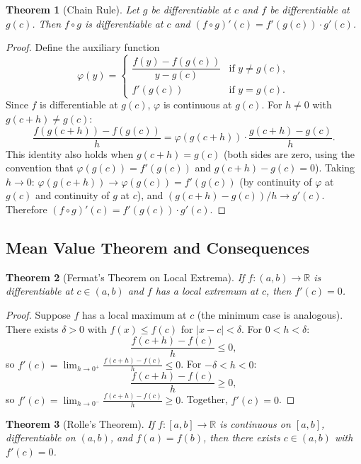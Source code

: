 \documentclass[11pt,a4paper]{article}
\theoremstyle{definition}
\theoremstyle{plain}
\newtheorem{theorem}{Theorem}[section]
\theoremstyle{remark}
\newcommand{\R}{\mathbb{R}}
\begin{document}
\begin{theorem}[Chain Rule]
\label{thm:chain_rule}
Let $g$ be differentiable at $c$ and $f$ be differentiable at $g(c)$. Then
$f \circ g$ is differentiable at $c$ and $(f \circ g)'(c) = f'(g(c)) \cdot g'(c)$.
\end{theorem}

\begin{proof}
Define the auxiliary function
\[
\varphi(y) =
\begin{cases}
\dfrac{f(y) - f(g(c))}{y - g(c)} & \text{if } y \neq g(c), \\[6pt]
f'(g(c)) & \text{if } y = g(c).
\end{cases}
\]
Since $f$ is differentiable at $g(c)$, $\varphi$ is continuous at $g(c)$.
For $h \neq 0$ with $g(c+h) \neq g(c)$:
\[
\frac{f(g(c+h)) - f(g(c))}{h}
= \varphi(g(c+h)) \cdot \frac{g(c+h) - g(c)}{h}.
\]
This identity also holds when $g(c+h) = g(c)$ (both sides are zero, using the
convention that $\varphi(g(c)) = f'(g(c))$ and $g(c+h) - g(c) = 0$).
Taking $h \to 0$: $\varphi(g(c+h)) \to \varphi(g(c)) = f'(g(c))$ (by continuity
of $\varphi$ at $g(c)$ and continuity of $g$ at $c$), and
$(g(c+h) - g(c))/h \to g'(c)$. Therefore
$(f \circ g)'(c) = f'(g(c)) \cdot g'(c)$.
\end{proof}

\subsection{Mean Value Theorem and Consequences}
\label{subsec:mvt}

\begin{theorem}[Fermat's Theorem on Local Extrema]
\label{thm:fermat}
If $f : (a, b) \to \R$ is differentiable at $c \in (a, b)$ and $f$ has a local
extremum at $c$, then $f'(c) = 0$.
\end{theorem}

\begin{proof}
Suppose $f$ has a local maximum at $c$ (the minimum case is analogous). There
exists $\delta > 0$ with $f(x) \le f(c)$ for $|x - c| < \delta$. For
$0 < h < \delta$:
\[
\frac{f(c+h) - f(c)}{h} \le 0,
\]
so $f'(c) = \lim_{h \to 0^+} \frac{f(c+h)-f(c)}{h} \le 0$. For
$-\delta < h < 0$:
\[
\frac{f(c+h) - f(c)}{h} \ge 0,
\]
so $f'(c) = \lim_{h \to 0^-} \frac{f(c+h)-f(c)}{h} \ge 0$. Together, $f'(c) = 0$.
\end{proof}

\begin{theorem}[Rolle's Theorem]
\label{thm:rolle}
If $f : [a, b] \to \R$ is continuous on $[a, b]$, differentiable on $(a, b)$,
and $f(a) = f(b)$, then there exists $c \in (a, b)$ with $f'(c) = 0$.
\end{theorem}
\end{document}
